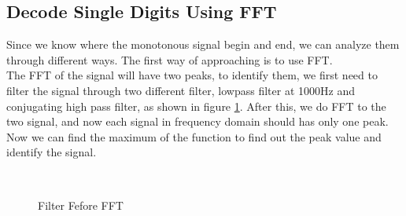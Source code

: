\documentclass[journal]{./sty/IEEEtran}
\let\MYoriglatexcaption\caption
\renewcommand{\caption}[2][\relax]{\MYoriglatexcaption[#2]{#2}}
\begin{document}
\subsection{Decode Single Digits Using FFT}
Since we know where the monotonous signal begin and end, we can analyze them through different ways. The first way of approaching is to use FFT.\\
\indent The FFT of the signal will have two peaks, to identify them, we first need to filter the signal through two different filter, lowpass filter at 1000Hz and conjugating high pass filter, as shown in figure \ref{fig:fbf}. After this, we do FFT to the two signal, and now each signal in frequency domain should has only one peak. Now we can find the maximum of the function to find out the peak value and identify the signal. 
\begin{figure}
\centering
{}
\\
\renewcommand{\figurename}{Fig}
\caption{Filter Fefore FFT}
\label{fig:fbf}
\end{figure}
\end{document}

